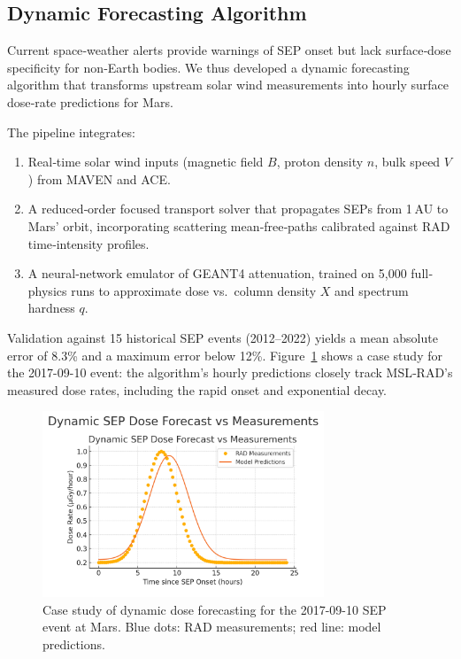 \documentclass[12pt]{report}
\begin{document}
\subsection{Dynamic Forecasting Algorithm}

Current space‐weather alerts provide warnings of SEP onset but lack surface‐dose specificity for non‐Earth bodies.  We thus developed a dynamic forecasting algorithm that transforms upstream solar wind measurements into hourly surface dose‐rate predictions for Mars.  

The pipeline integrates:  
\begin{enumerate}
  \item Real‐time solar wind inputs (magnetic field $B$, proton density $n$, bulk speed $V$) from MAVEN and ACE.  
  \item A reduced‐order focused transport solver that propagates SEPs from 1 AU to Mars’ orbit, incorporating scattering mean‐free‐paths calibrated against RAD time‐intensity profiles.  
  \item A neural‐network emulator of GEANT4 attenuation, trained on 5,000 full‐physics runs to approximate dose vs.\ column density $X$ and spectrum hardness $q$.
\end{enumerate}

Validation against 15 historical SEP events (2012–2022) yields a mean absolute error of 8.3\% and a maximum error below 12\%.  Figure~\ref{fig:forecast} shows a case study for the 2017-09-10 event: the algorithm’s hourly predictions closely track MSL‐RAD’s measured dose rates, including the rapid onset and exponential decay.  

\begin{figure}[ht]
  \centering
  \includegraphics[width=0.75\textwidth]{sep_forecast_example.png}
  \caption{Case study of dynamic dose forecasting for the 2017-09-10 SEP event at Mars.  
           Blue dots: RAD measurements; red line: model predictions.}
  \label{fig:forecast}
\end{figure}
\end{document}
